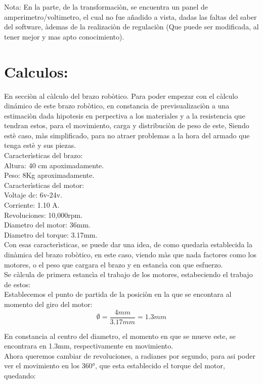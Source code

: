 \documentclass[14pt,a4paper]{article}
\begin{document}
Nota: En la parte, de la transformaciòn, se encuentra un panel de amperimetro/voltimetro, el cual no fue añadido a vista, dadas las faltas del saber del software, àdemas de la realizaciòn de regulaciòn (Que puede ser modificada, al tener mejor y mas apto conocimiento).

\section{Calculos:}
En secciòn al càlculo del brazo robòtico. Para poder empezar con el càlculo dinámico de este brazo robòtico, en constancia de previsualizaciòn a una estimaciòn dada hipotesis en perpectiva a los materiales y a la resistencia que tendran estos, para el movimiento, carga y distribuciòn de peso de este, Siendo estè caso, màs simplificado, para no atraer problemas a la hora del armado que tenga estè y sus piezas.\\

Caracterìsticas del brazo:\\
Altura: 40 cm apoximadamente.\\
Peso: 8Kg aproximadamente.\\
Caracterìsticas del motor:\\
Voltaje dc: 6v-24v.\\
Corriente: 1.10 A.\\
Revoluciones: 10,000rpm.\\
Diametro del motor: 36mm.\\
Diametro del torque: 3.17mm.\\
Con esas caracterìsticas, se puede dar una idea, de como quedarìa establecida la dinàmica del brazo robòtico, en este caso, viendo màs que nada factores como los motores, o el peso que cargara el brazo y en estancìa con que esfuerzo.\\
Se càlcula de primera estancìa el trabajo de los motores, estabeciendo el trabajo de estos:\\

Establecemos el punto de partida de la posiciòn en la que se encontara al momento del giro del motor:\\

$$ \emptyset=\frac{4mm}{3.17mm}= 1.3mm $$

En constancia al centro del diametro, el momento en que se mueve este, se encontrara en 1.3mm, respectivamente en movimiento.\\
Ahora queremos cambiar de revoluciones, a radianes por segundo, para asi poder ver el movimiento en los 360°, que esta establecido el torque del motor, quedando:\\
\end{document}

